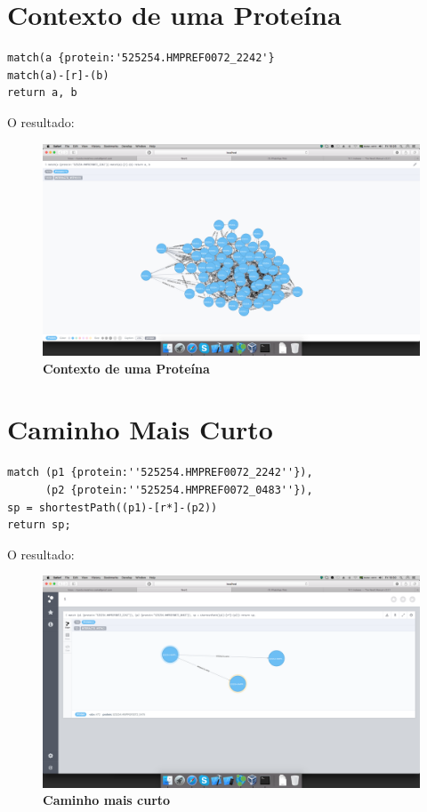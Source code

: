 \documentclass[a4paper, 12pt]{article}
\begin{document}
\section{Contexto de uma Proteína}

\begin{lstlisting}[frame=single]
match(a {protein:'525254.HMPREF0072_2242'}
match(a)-[r]-(b)
return a, b
\end{lstlisting}

O resultado:
\begin{figure}[H]
  \centering
  \includegraphics[width=1\textwidth]{5}
  \caption[5 - Context de uma Proteína]{\textbf{Contexto de uma Proteína}}
\end{figure} 

\section{Caminho Mais Curto}

\begin{lstlisting}[frame=single]
match (p1 {protein:''525254.HMPREF0072_2242''}), 
      (p2 {protein:''525254.HMPREF0072_0483''}),
sp = shortestPath((p1)-[r*]-(p2))
return sp;

\end{lstlisting}

O resultado:
\begin{figure}[H]
  \centering
  \includegraphics[width=1\textwidth]{6}
  \caption[6 - Caminho mais curto]{\textbf{Caminho mais curto}}
\end{figure}
\end{document}
